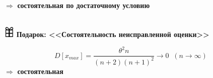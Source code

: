 $\Rightarrow$ \textbf{состоятельная по достаточному условию}\\
\vspace{1.5mm}\\
\begin{flushleft}
    \includegraphics[width=0.04\textwidth]{images/present.png} 
    \textbf{Подарок: <<Состоятельность неисправленной оценки>>}
\end{flushleft}
\begin{equation*}
   D\left[x_{max} \right] =  \frac{\theta^2n}{(n+2)(n+1)^2} \to 0 \;\; (n\to\infty)
\end{equation*}
$\Rightarrow$ \textbf{состоятельная} \\

